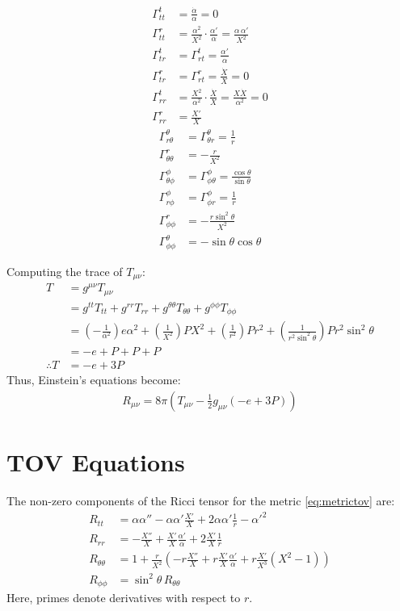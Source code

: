 \documentclass[12pt]{report}
\begin{document}
	
	\begin{align*}
		\Gamma_{tt}^t &= \frac{\dot{\alpha}}{\alpha}=0\\
		\Gamma_{tt}^r &= \frac{\alpha^2}{X^2} \cdot \frac{\alpha'}{\alpha} = \frac{\alpha\,\alpha'}{X^2} \\
		\Gamma_{tr}^t &= \Gamma_{rt}^t= \frac{\alpha'}{\alpha}  \\
		\Gamma_{tr}^r &= \Gamma_{rt}^r = \frac{\dot{X}}{X}=0 \\
		\Gamma_{rr}^t &= \frac{X^2}{\alpha^2} \cdot \frac{\dot{X}}{X} = \frac{X\dot{X}}{\alpha^2}=0 \\
		\Gamma_{rr}^r &= \frac{X'}{X}
	\end{align*}
	\begin{align*}
		\Gamma_{r\theta}^{\theta} & = \Gamma_{\theta r}^{\theta}= \frac{1}{r} \\
		\Gamma_{\theta\theta}^r &= -\frac{r}{X^2} \\
		\Gamma_{\theta\phi}^{\phi} &= \Gamma_{\phi\theta}^{\phi} = \frac{\cos\theta}{\sin\theta} \\
		\Gamma_{r\phi}^{\phi} &= \Gamma_{\phi r}^{\phi} = \frac{1}{r} \\
		\Gamma_{\phi\phi}^r &= -\frac{r\sin^2\theta}{X^2} \\
		\Gamma_{\phi\phi}^{\theta} &= -\sin\theta\cos\theta
	\end{align*}
	
	Computing the trace of $T_{\mu\nu}$:
	\begin{align}
		T &= g^{\mu\nu}T_{\mu\nu}\\
		&= g^{tt}T_{tt}+g^{rr}T_{rr}+g^{\theta\theta}T_{\theta\theta}+g^{\phi\phi}T_{\phi\phi} \\
		&= \left(-\frac{1}{\alpha^2}\right)e\alpha^2+\left(\frac{1}{X^2}\right)PX^2+\left(\frac{1}{r^2}\right)Pr^2+\left(\frac{1}{r^2\sin^2\theta}\right)Pr^2\sin^2\theta\\
		&= -e + P + P + P\\
		\therefore T &= -e + 3P
	\end{align}
	Thus, Einstein's equations become:
	\begin{align}
		R_{\mu\nu}=8\pi\left(T_{\mu\nu}-\frac{1}{2}g_{\mu\nu}(-e+3P)\right)
	\end{align}
	\section{TOV Equations}
	The non-zero components of the Ricci tensor for the metric \eqref{eq:metrictov} are:
	\begin{align}
		R_{tt}&=\alpha\alpha''-\alpha\alpha'\frac{X'}{X}+2\alpha\alpha'\frac{1}{r}-\alpha'^2\\
		R_{rr}&=-\frac{X''}{X}+\frac{X'}{X}\frac{\alpha'}{\alpha}+2\frac{X'}{X}\frac{1}{r}\\
		R_{\theta\theta}&=1+\frac{r}{X^2}\left(-r\frac{X''}{X}+r\frac{X'}{X}\frac{\alpha'}{\alpha}+r\frac{X'}{X^3}\left(X^2-1\right)\right)\\
		R_{\phi\phi}&=\sin^2\theta\,R_{\theta\theta}
	\end{align}
	Here, primes denote derivatives with respect to $r$.\\
	
\end{document}
